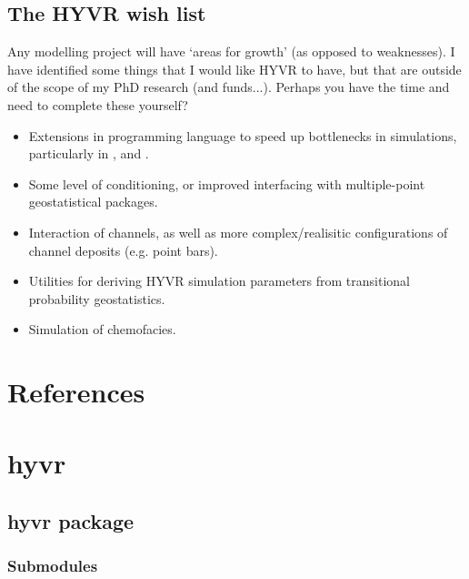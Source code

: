 \documentclass[letterpaper,10pt,english]{sphinxmanual}
\begin{document}
\section{The HYVR wish list}
\label{more:the-hyvr-wish-list}
Any modelling project will have `areas for growth' (as opposed to weaknesses). I have identified some things that I would like HYVR to have, but that are outside of the scope of my PhD research (and funds...). Perhaps you have the time and need to complete these yourself?
\begin{itemize}
\item {} 
Extensions in  programming language to speed up bottlenecks in simulations, particularly in , and .

\item {} 
Some level of conditioning, or improved interfacing with multiple-point geostatistical packages.

\item {} 
Interaction of channels, as well as more complex/realisitic configurations of channel deposits (e.g. point bars).

\item {} 
Utilities for deriving HYVR simulation parameters from transitional probability geostatistics.

\item {} 
Simulation of chemofacies.

\end{itemize}


\chapter{References}
\label{references:references}\label{references::doc}



\chapter{hyvr}
\label{modules::doc}\label{modules:hyvr}

\section{hyvr package}
\label{hyvr::doc}\label{hyvr:hyvr-package}

\subsection{Submodules}
\label{hyvr:submodules}
\end{document}
